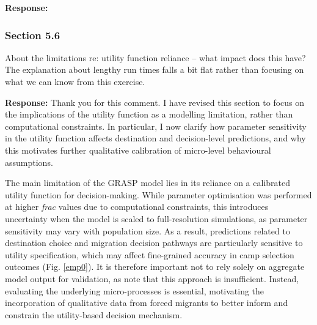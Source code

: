 \documentclass[11pt,a4paper]{article}
\begin{document}
\textbf{Response:}

\vspace{0.5cm}

\begin{updatebox}

\end{updatebox}

\vspace{0.5cm}

\subsubsection*{Section 5.6}

\begin{reviewbox}
About the limitations re: utility function reliance -- what impact does this have? The explanation about lengthy run times falls a bit flat rather than focusing on what we can know from this exercise.
\end{reviewbox}

\textbf{Response:}
Thank you for this comment. I have revised this section to focus on the implications of the utility function as a modelling limitation, rather than computational constraints. In particular, I now clarify how parameter sensitivity in the utility function affects destination and decision-level predictions, and why this motivates further qualitative calibration of micro-level behavioural assumptions.
\vspace{0.5cm}

\begin{updatebox}
The main limitation of the GRASP model lies in its reliance on a calibrated utility function for decision-making. While parameter optimisation was performed at higher \textit{frac} values due to computational constraints, this introduces uncertainty when the model is scaled to full-resolution simulations, as parameter sensitivity may vary with population size. As a result, predictions related to destination choice and migration decision pathways are particularly sensitive to utility specification, which may affect fine-grained accuracy in camp selection outcomes (Fig. \ref{emp0}). It is therefore important not to rely solely on aggregate model output for validation, as \citet{He-In} note that this approach is insufficient. Instead, evaluating the underlying micro-processes is essential, motivating the incorporation of qualitative data from forced migrants to better inform and constrain the utility-based decision mechanism.
\end{updatebox}

\vspace{0.5cm}
\end{document}
